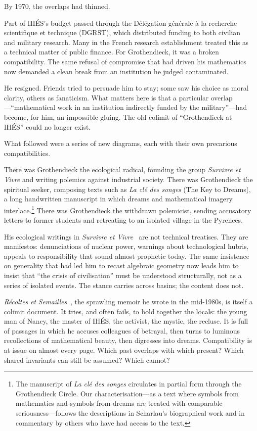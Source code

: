 \documentclass[12pt,a4paper]{article}
\begin{document}
By 1970, the overlaps had thinned.

Part of IH\'ES's budget passed through the D\'el\'egation g\'en\'erale \`a la recherche scientifique et technique (DGRST), which distributed funding to both civilian and military research. Many in the French research establishment treated this as a technical matter of public finance. For Grothendieck, it was a broken compatibility. The same refusal of compromise that had driven his mathematics now demanded a clean break from an institution he judged contaminated.

He resigned. Friends tried to persuade him to stay; some saw his choice as moral clarity, others as fanaticism. What matters here is that a particular overlap---``mathematical work in an institution indirectly funded by the military''---had become, for him, an impossible gluing. The old colimit of ``Grothendieck at IH\'ES'' could no longer exist.

What followed were a series of new diagrams, each with their own precarious compatibilities.

There was Grothendieck the ecological radical, founding the group \emph{Survivre et Vivre} and writing polemics against industrial society. There was Grothendieck the spiritual seeker, composing texts such as \emph{La cl\'e des songes} (The Key to Dreams), a long handwritten manuscript in which dreams and mathematical imagery interlace.\footnote{The manuscript of \emph{La cl\'e des songes} circulates in partial form through the Grothendieck Circle. Our characterisation---as a text where symbols from mathematics and symbols from dreams are treated with comparable seriousness---follows the descriptions in Scharlau's biographical work and in commentary by others who have had access to the text.} There was Grothendieck the withdrawn polemicist, sending accusatory letters to former students and retreating to an isolated village in the Pyrenees.

His ecological writings in \emph{Survivre et Vivre}~\cite{survivre} are not technical treatises. They are manifestos: denunciations of nuclear power, warnings about technological hubris, appeals to responsibility that sound almost prophetic today. The same insistence on generality that had led him to recast algebraic geometry now leads him to insist that ``the crisis of civilisation'' must be understood structurally, not as a series of isolated events. The stance carries across basins; the content does not.

\emph{R\'ecoltes et Semailles}~\cite{grothendieck_res}, the sprawling memoir he wrote in the mid-1980s, is itself a colimit document. It tries, and often fails, to hold together the locals: the young man of Nancy, the master of IH\'ES, the activist, the mystic, the recluse. It is full of passages in which he accuses colleagues of betrayal, then turns to luminous recollections of mathematical beauty, then digresses into dreams. Compatibility is at issue on almost every page. Which past overlaps with which present? Which shared invariants can still be assumed? Which cannot?
\end{document}
